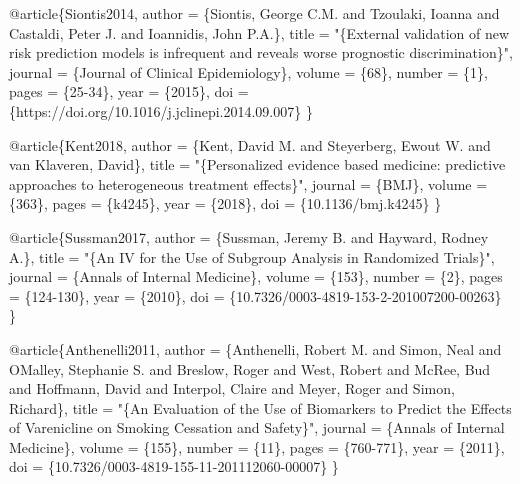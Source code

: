 \documentclass[
  letterpaper,
  DIV=11,
  numbers=noendperiod]{scrartcl}
\newenvironment{Shaded}{\begin{snugshade}}{\end{snugshade}}
\newcommand{\DataTypeTok}[1]{\textcolor[rgb]{0.68,0.00,0.00}{#1}}
\newcommand{\NormalTok}[1]{\textcolor[rgb]{0.00,0.23,0.31}{#1}}
\newcommand{\OtherTok}[1]{\textcolor[rgb]{0.00,0.23,0.31}{#1}}
\newcommand{\StringTok}[1]{\textcolor[rgb]{0.13,0.47,0.30}{#1}}
\newcommand{\VariableTok}[1]{\textcolor[rgb]{0.07,0.07,0.07}{#1}}
\begin{document}
\begin{Shaded}
\begin{Highlighting}[]
\VariableTok{@article}\NormalTok{\{}\OtherTok{Siontis2014}\NormalTok{,}
    \DataTypeTok{author}\NormalTok{ = \{Siontis, George C.M. and Tzoulaki, Ioanna and Castaldi, Peter J. and Ioannidis, John P.A.\},}
    \DataTypeTok{title}\NormalTok{ = "}\StringTok{\{External validation of new risk prediction models is infrequent and reveals worse prognostic discrimination\}}\NormalTok{",}
    \DataTypeTok{journal}\NormalTok{ = \{Journal of Clinical Epidemiology\},}
    \DataTypeTok{volume}\NormalTok{ = \{68\},}
    \DataTypeTok{number}\NormalTok{ = \{1\},}
    \DataTypeTok{pages}\NormalTok{ = \{25{-}34\},}
    \DataTypeTok{year}\NormalTok{ = \{2015\},}
    \DataTypeTok{doi}\NormalTok{ = \{https://doi.org/10.1016/j.jclinepi.2014.09.007\}}
\NormalTok{\}}

\VariableTok{@article}\NormalTok{\{}\OtherTok{Kent2018}\NormalTok{,}
    \DataTypeTok{author}\NormalTok{ = \{Kent, David M. and Steyerberg, Ewout W. and van Klaveren, David\},}
    \DataTypeTok{title}\NormalTok{ = "}\StringTok{\{Personalized evidence based medicine: predictive approaches to heterogeneous treatment effects\}}\NormalTok{",}
    \DataTypeTok{journal}\NormalTok{ = \{BMJ\},}
    \DataTypeTok{volume}\NormalTok{ = \{363\},}
    \DataTypeTok{pages}\NormalTok{ = \{k4245\},}
    \DataTypeTok{year}\NormalTok{ = \{2018\},}
    \DataTypeTok{doi}\NormalTok{ = \{10.1136/bmj.k4245\}}
\NormalTok{\}}

\VariableTok{@article}\NormalTok{\{}\OtherTok{Sussman2017}\NormalTok{,}
    \DataTypeTok{author}\NormalTok{ = \{Sussman, Jeremy B. and Hayward, Rodney A.\},}
    \DataTypeTok{title}\NormalTok{ = "}\StringTok{\{An IV for the Use of Subgroup Analysis in Randomized Trials\}}\NormalTok{",}
    \DataTypeTok{journal}\NormalTok{ = \{Annals of Internal Medicine\},}
    \DataTypeTok{volume}\NormalTok{ = \{153\},}
    \DataTypeTok{number}\NormalTok{ = \{2\},}
    \DataTypeTok{pages}\NormalTok{ = \{124{-}130\},}
    \DataTypeTok{year}\NormalTok{ = \{2010\},}
    \DataTypeTok{doi}\NormalTok{ = \{10.7326/0003{-}4819{-}153{-}2{-}201007200{-}00263\}}
\NormalTok{\}}

\VariableTok{@article}\NormalTok{\{}\OtherTok{Anthenelli2011}\NormalTok{,}
    \DataTypeTok{author}\NormalTok{ = \{Anthenelli, Robert M. and Simon, Neal and O\textquotesingle{}Malley, Stephanie S. and Breslow, Roger and West, Robert and McRee, Bud and Hoffmann, David and Interpol, Claire and Meyer, Roger and Simon, Richard\},}
    \DataTypeTok{title}\NormalTok{ = "}\StringTok{\{An Evaluation of the Use of Biomarkers to Predict the Effects of Varenicline on Smoking Cessation and Safety\}}\NormalTok{",}
    \DataTypeTok{journal}\NormalTok{ = \{Annals of Internal Medicine\},}
    \DataTypeTok{volume}\NormalTok{ = \{155\},}
    \DataTypeTok{number}\NormalTok{ = \{11\},}
    \DataTypeTok{pages}\NormalTok{ = \{760{-}771\},}
    \DataTypeTok{year}\NormalTok{ = \{2011\},}
    \DataTypeTok{doi}\NormalTok{ = \{10.7326/0003{-}4819{-}155{-}11{-}201112060{-}00007\}}
\NormalTok{\}}


\end{Highlighting}
\end{Shaded}
\end{document}
